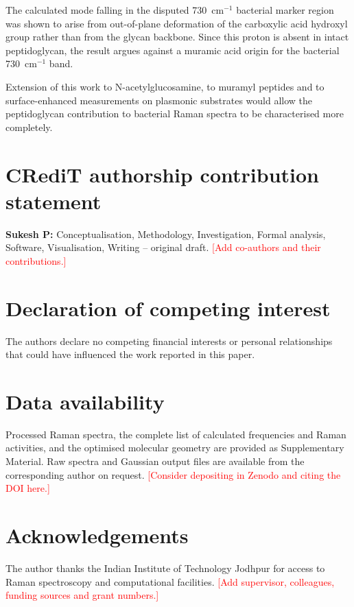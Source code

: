 \documentclass[preprint,12pt]{elsarticle}
\newcommand{\wn}{\ensuremath{\mathrm{cm}^{-1}}}
\newcommand{\authorcheck}[1]{\textcolor{red}{[#1]}}
\begin{document}
The calculated mode falling in the disputed 730~\wn{} bacterial marker region
was shown to arise from out-of-plane deformation of the carboxylic acid
hydroxyl group rather than from the glycan backbone. Since this proton is
absent in intact peptidoglycan, the result argues against a muramic acid
origin for the bacterial 730~\wn{} band.

Extension of this work to N-acetylglucosamine, to muramyl peptides and to
surface-enhanced measurements on plasmonic substrates would allow the
peptidoglycan contribution to bacterial Raman spectra to be characterised
more completely.

\section*{CRediT authorship contribution statement}
\textbf{Sukesh P:} Conceptualisation, Methodology, Investigation, Formal
analysis, Software, Visualisation, Writing -- original draft.
\authorcheck{Add co-authors and their contributions.}

\section*{Declaration of competing interest}
The authors declare no competing financial interests or personal
relationships that could have influenced the work reported in this paper.

\section*{Data availability}
Processed Raman spectra, the complete list of calculated frequencies and
Raman activities, and the optimised molecular geometry are provided as
Supplementary Material. Raw spectra and Gaussian output files are available
from the corresponding author on request. \authorcheck{Consider depositing in
Zenodo and citing the DOI here.}

\section*{Acknowledgements}
The author thanks the Indian Institute of Technology Jodhpur for access to
Raman spectroscopy and computational facilities.
\authorcheck{Add supervisor, colleagues, funding sources and grant numbers.}
\end{document}
